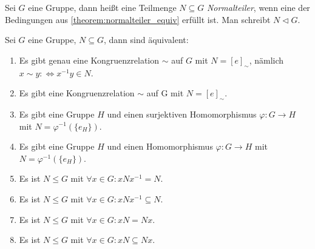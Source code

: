 \begin{definition}
    Sei $G$ eine Gruppe, dann heißt eine Teilmenge $N \subseteq G$ \emph{Normalteiler}, wenn eine der Bedingungen aus \cref{theorem:normalteiler_equiv} erfüllt ist. Man schreibt $N\vartriangleleft G$.
\end{definition}

\begin{theorem}\label{theorem:normalteiler_equiv}
    Sei $G$ eine Gruppe, $N \subseteq G$, dann sind äquivalent:
    \begin{enumerate}[label=(\enumArabicDual*)]
        \item\label{item:theorem:normalteiler_equiv_1} Es gibt genau eine Kongruenzrelation $\sim$ auf $G$ mit $N = [e]_\sim$, nämlich $x \sim y: \Leftrightarrow x^{-1}y \in N$.
        \item\label{item:theorem:normalteiler_equiv_1'} Es gibt eine Kongruenzrelation $\sim$ auf G mit $N = [e]_\sim$.
        \item\label{item:theorem:normalteiler_equiv_2} Es gibt eine Gruppe $H$ und einen surjektiven Homomorphismus $\varphi: G \to H$ mit $N = \varphi^{-1}(\{e_H\})$.
        \item\label{item:theorem:normalteiler_equiv_2'} Es gibt eine Gruppe $H$ und einen Homomorphismus $\varphi: G \to H$ mit $N = \varphi^{-1}(\{e_H\})$.
        \item\label{item:theorem:normalteiler_equiv_3} Es ist $N \le G$ mit $\forall x \in G: xNx^{-1} = N$.
        \item\label{item:theorem:normalteiler_equiv_3'} Es ist $N \le G$ mit $\forall x \in G: xNx^{-1} \subseteq N$.
        \item\label{item:theorem:normalteiler_equiv_4} Es ist $N \le G$ mit $\forall x \in G: xN = Nx$.
        \item\label{item:theorem:normalteiler_equiv_4'} Es ist $N \le G$ mit $\forall x \in G: xN \subseteq Nx$.
    \end{enumerate}
\end{theorem}


